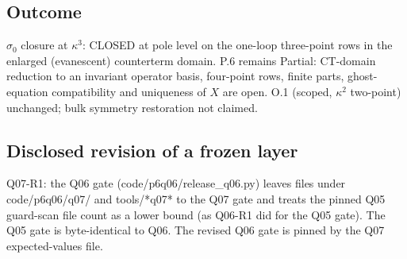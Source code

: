 \subsection*{Outcome}
$\sigma_0$ closure at $\kappa^3$: CLOSED at pole level on the one-loop three-point rows in the enlarged (evanescent)
counterterm domain. P.6 remains Partial: CT-domain reduction to an invariant operator basis, four-point rows, finite
parts, ghost-equation compatibility and uniqueness of $X$ are open. O.1 (scoped, $\kappa^2$ two-point) unchanged;
bulk symmetry restoration not claimed.
\subsection*{Disclosed revision of a frozen layer}
Q07-R1: the Q06 gate (code/p6q06/release\_q06.py) leaves files under code/p6q06/q07/ and tools/*q07* to the Q07 gate
and treats the pinned Q05 guard-scan file count as a lower bound (as Q06-R1 did for the Q05 gate). The Q05 gate is
byte-identical to Q06. The revised Q06 gate is pinned by the Q07 expected-values file.
